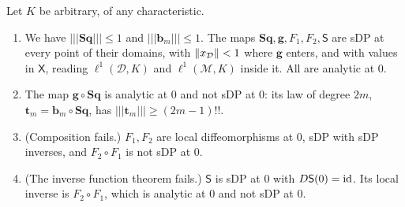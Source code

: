 \begin{theorem}\label{dp:thm:strong-failure}
Let $K$ be arbitrary, of any characteristic.
\begin{enumerate}
\item We have $\lvert\!\lvert\!\lvert \mathbf{Sq}\rvert\!\rvert\!\rvert\le1$ and $\lvert\!\lvert\!\lvert \mathbf b_m\rvert\!\rvert\!\rvert\le1$. The maps $\mathbf{Sq},\mathbf g,F_1,F_2,\mathsf S$ are sDP at every point of their domains, with $\lVert x_{\mathcal D}\rVert<1$ where $\mathbf g$ enters, and with values in $\mathsf X$, reading $\ell^1(\mathcal D,K)$ and $\ell^1(\mathcal M,K)$ inside it. All are analytic at $0$.
\item The map $\mathbf g\circ\mathbf{Sq}$ is analytic at $0$ and not sDP at $0$: its law of degree $2m$, $\mathbf t_m=\mathbf b_m\circ\mathbf{Sq}$, has $\lvert\!\lvert\!\lvert \mathbf t_m\rvert\!\rvert\!\rvert\ge(2m-1)!!$.
\item \textup{(Composition fails.)} $F_1,F_2$ are local diffeomorphisms at $0$, sDP with sDP inverses, and $F_2\circ F_1$ is not sDP at $0$.
\item \textup{(The inverse function theorem fails.)} $\mathsf S$ is sDP at $0$ with $D\mathsf S(0)=\mathrm{id}$. Its local inverse is $F_2\circ F_1$, which is analytic at $0$ and not sDP at $0$.
\end{enumerate}
\end{theorem}

